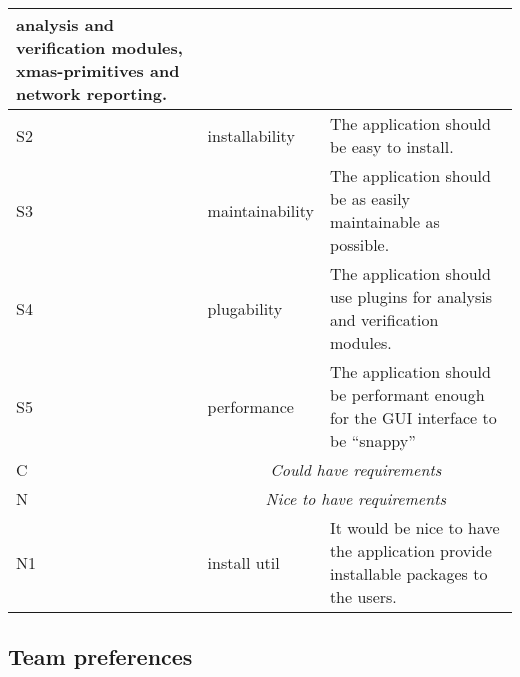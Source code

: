 \begin{center}
\begin{tabular}{|l|p{7em}|p{23em}|}
				analysis and verification modules, xmas-primitives and
				network reporting.
		\\\hline
	S2	& installability & The application should be easy to install.
		\\\hline
	S3	& maintainability & The application should be as easily maintainable as possible.
		\\\hline
	S4	& plugability	& The application should use plugins for analysis and
				verification modules.
		\\\hline
	S5	& performance	& The application should be performant enough for the GUI
				    interface to be ``snappy''
		\\\hline
	C	& \multicolumn{2}{c|}{\sf\emph{\large Could have requirements}}
		\\\hline
	N	& \multicolumn{2}{c|}{\sf\emph{\large Nice to have requirements}}
		\\\hline
	N1	& install util	& It would be nice to have the application provide
				installable packages to the users.
		\\\hline
    \end{tabular}
    \label{tab:appl-requirements}
\end{center}

\subsection{Team preferences}



